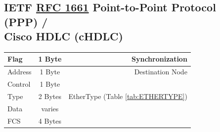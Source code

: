 \documentclass[12pt]{article}
\newcommand{\RFC}[1]{\href{https://datatracker.ietf.org/doc/html/rfc#1}{RFC #1}}
\begin{document}
	\subsection[IETF RFC 1661 PPP / Cisco HDLC (cHDLC)]{IETF \RFC{1661} Point-to-Point Protocol (PPP) /\\Cisco HDLC (cHDLC) \label{subsec:IETF PPP}}
	\begin{table}[H]
	\centering
	\begin{tabular}{| l | c | r |}
	\hline
	Flag		& 1 Byte	& Synchronization\\\hline
	Address	& 1 Byte	& Destination Node\\\hline
	Control	& 1 Byte	&\\\hline
	Type		& 2 Bytes	& EtherType (Table \ref{tab:ETHERTYPE})\\\hline
	Data		& varies	&\\\hline
	FCS		& 4 Bytes	&\\\hline
	\end{tabular}\end{table}





\end{document}
